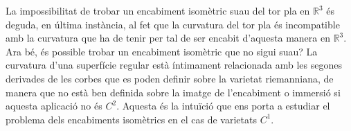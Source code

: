 





La impossibilitat de trobar un encabiment isomètric suau del tor pla en $\mathbb R^3$ és deguda, en última instància, al fet que la curvatura del tor pla és incompatible amb la curvatura que ha de tenir per tal de ser encabit d'aquesta manera en $\mathbb R^3$. Ara bé, és possible trobar un encabiment isomètric que no sigui suau? La curvatura d'una superfície regular està íntimament relacionada amb les segones derivades de les corbes que es poden definir sobre la varietat riemanniana, de manera que no està ben definida sobre la imatge de l'encabiment o immersió si aquesta aplicació no és $C^2$. Aquesta és la intuïció que ens porta a estudiar el problema dels encabiments isomètrics en el cas de varietats $C^1$.

